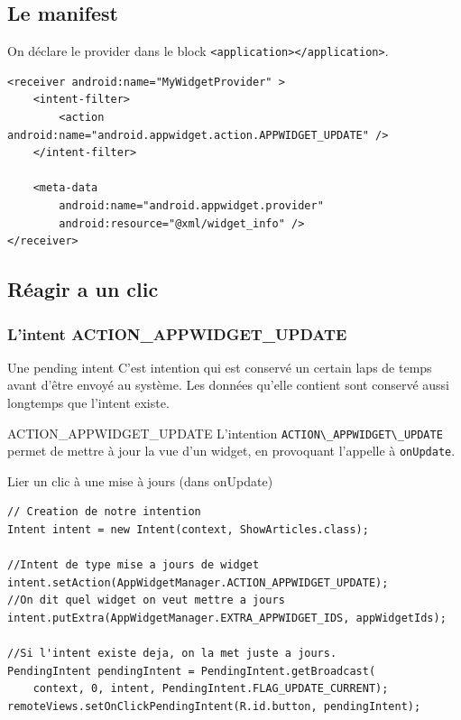 \documentclass{beamer}
\begin{document}
\subsection{Le manifest}
\begin{frame}[fragile]
\begin{block}{On déclare le provider dans le block \verb!<application></application>!.}
\lstset{language=xml}
\begin{lstlisting}
<receiver android:name="MyWidgetProvider" >
    <intent-filter>
        <action android:name="android.appwidget.action.APPWIDGET_UPDATE" />
    </intent-filter>

    <meta-data
        android:name="android.appwidget.provider"
        android:resource="@xml/widget_info" />
</receiver>
\end{lstlisting}
\end{block}
\end{frame}

\subsection{Réagir a un clic}
\begin{frame}
\frametitle{L'intent ACTION\_APPWIDGET\_UPDATE}
\begin{block}{Une pending intent}
C'est intention qui est conservé un certain laps de temps avant d’être envoyé au système. Les données qu'elle contient sont conservé aussi longtemps que l'intent existe.
\end{block}
\begin{block}{ACTION\_APPWIDGET\_UPDATE}
L'intention \verb!ACTION\_APPWIDGET\_UPDATE! permet de mettre à jour la vue d'un widget, en provoquant l'appelle à \verb!onUpdate!.
\end{block}
\end{frame}

\begin{frame}[fragile]
\lstset{language=java}
\begin{block}{Lier un clic à une mise à jours (dans onUpdate)}
\begin{lstlisting}
// Creation de notre intention
Intent intent = new Intent(context, ShowArticles.class);

//Intent de type mise a jours de widget
intent.setAction(AppWidgetManager.ACTION_APPWIDGET_UPDATE);
//On dit quel widget on veut mettre a jours
intent.putExtra(AppWidgetManager.EXTRA_APPWIDGET_IDS, appWidgetIds);

//Si l'intent existe deja, on la met juste a jours.
PendingIntent pendingIntent = PendingIntent.getBroadcast(
    context, 0, intent, PendingIntent.FLAG_UPDATE_CURRENT);
remoteViews.setOnClickPendingIntent(R.id.button, pendingIntent);
\end{lstlisting}
\end{block}
\end{frame}
\end{document}
